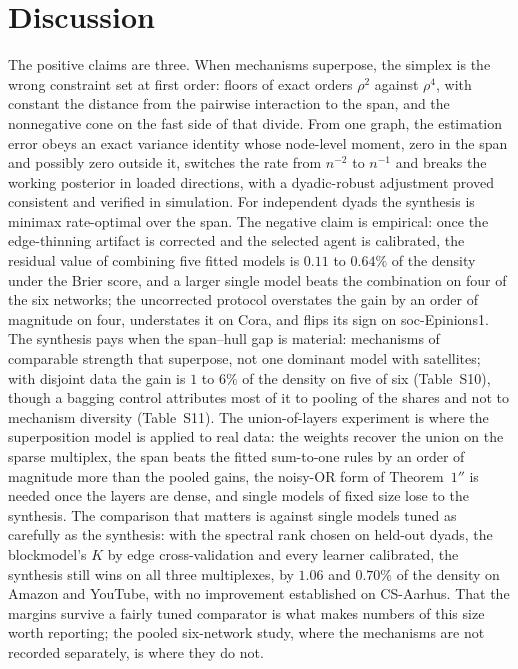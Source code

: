 \documentclass[12pt]{article}
\begin{document}
\section{Discussion}
\label{sec:discussion}

The positive claims are three. When mechanisms superpose, the simplex is the wrong constraint set at first order: floors of exact orders $\rho^2$ against $\rho^4$, with constant the distance from the pairwise interaction to the span, and the nonnegative cone on the fast side of that divide. From one graph, the estimation error obeys an exact variance identity whose node-level moment, zero in the span and possibly zero outside it, switches the rate from $n^{-2}$ to $n^{-1}$ and breaks the working posterior in loaded directions, with a dyadic-robust adjustment proved consistent and verified in simulation. For independent dyads the synthesis is minimax rate-optimal over the span. The negative claim is empirical: once the edge-thinning artifact is corrected and the selected agent is calibrated, the residual value of combining five fitted models is $0.11$ to $0.64\%$ of the density under the Brier score, and a larger single model beats the combination on four of the six networks; the uncorrected protocol overstates the gain by an order of magnitude on four, understates it on Cora, and flips its sign on soc-Epinions1. The synthesis pays when the span--hull gap is material: mechanisms of comparable strength that superpose, not one dominant model with satellites; with disjoint data the gain is $1$ to $6\%$ of the density on five of six (Table~S10), though a bagging control attributes most of it to pooling of the shares and not to mechanism diversity (Table~S11). The union-of-layers experiment is where the superposition model is applied to real data: the weights recover the union on the sparse multiplex, the span beats the fitted sum-to-one rules by an order of magnitude more than the pooled gains, the noisy-OR form of Theorem~$1''$ is needed once the layers are dense, and single models of fixed size lose to the synthesis. The comparison that matters is against single models tuned as carefully as the synthesis: with the spectral rank chosen on held-out dyads, the blockmodel's $K$ by edge cross-validation and every learner calibrated, the synthesis still wins on all three multiplexes, by $1.06$ and $0.70\%$ of the density on Amazon and YouTube, with no improvement established on CS-Aarhus. That the margins survive a fairly tuned comparator is what makes numbers of this size worth reporting; the pooled six-network study, where the mechanisms are not recorded separately, is where they do not.
\end{document}
